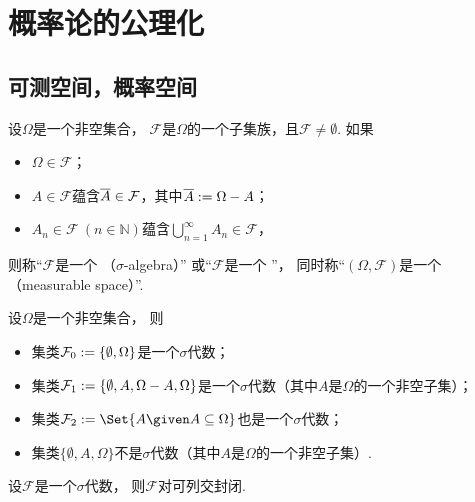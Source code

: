 \chapter{概率论的公理化}
\section{可测空间，概率空间}
\begin{definition}
设\(\Omega\)是一个非空集合，
\(\mathcal{F}\)是\(\Omega\)的一个子集族，且\(\mathcal{F}\neq\emptyset\).
如果\begin{itemize}
	\item \(\Omega \in \mathcal{F}\)；
	\item \(A \in \mathcal{F}\)蕴含\(\SetComplementaryL{A} \in \mathcal{F}\)，其中\(\SetComplementaryL{A} \defeq \Omega - A\)；
	\item \(A_n \in \mathcal{F}\ (n \in \mathbb{N})\)蕴含\(\bigcup_{n=1}^\infty A_n \in \mathcal{F}\)，
\end{itemize}
则称“\(\mathcal{F}\)是一个 （\(\sigma\)-algebra）”
或“\(\mathcal{F}\)是一个 ”，
同时称“\((\Omega,\mathcal{F})\)是一个（measurable space）”.
\end{definition}

\begin{example}
设\(\Omega\)是一个非空集合，
则\begin{itemize}
	\item 集类\(\mathcal{F}_0 := \{\emptyset,\Omega\}\)是一个\(\sigma\)代数；
	\item 集类\(\mathcal{F}_1 := \{\emptyset,A,\Omega-A,\Omega\}\)是一个\(\sigma\)代数（其中\(A\)是\(\Omega\)的一个非空子集）；
	\item 集类\(\mathcal{F}_2 \defeq \Set{ A \given A \subseteq \Omega}\)也是一个\(\sigma\)代数；
	\item 集类\(\{\emptyset,A,\Omega\}\)不是\(\sigma\)代数（其中\(A\)是\(\Omega\)的一个非空子集）.
\end{itemize}
\end{example}

\begin{property}
设\(\mathcal{F}\)是一个\(\sigma\)代数，
则\(\mathcal{F}\)对可列交封闭.
\end{property}

